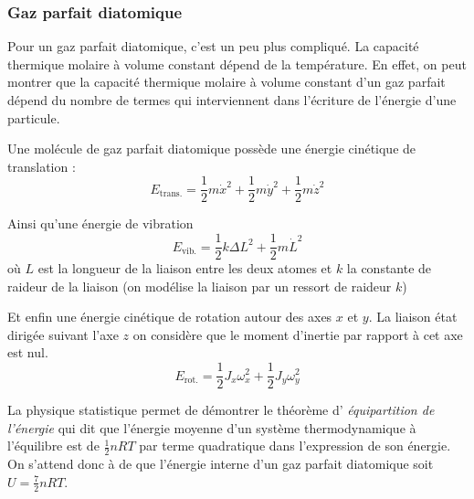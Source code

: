 \documentclass{cours}
\begin{document}
\subsubsection{Gaz parfait diatomique}%
\label{ssub:GP_diatomique}
Pour un gaz parfait diatomique, c'est un peu plus compliqué. La capacité thermique molaire à volume constant dépend de la température. En effet, on peut montrer que la capacité thermique molaire à volume constant d'un gaz parfait dépend du nombre de termes qui interviennent dans l'écriture de l'énergie d'une particule. 

Une molécule de gaz parfait diatomique possède une énergie cinétique de translation :
\begin{equation}
  E_{\text{trans.}} = \frac{1}{2}m \dot{x}^2 + \frac{1}{2}m \dot{y}^2 + \frac{1}{2}m \dot{z}^2
\end{equation}

Ainsi qu'une énergie de vibration 
 \begin{equation}
   E_\text{vib.} = \frac{1}{2}k \Delta L^2 + \frac{1}{2}m \dot{L}^2
 \end{equation}
 où $L$ est la longueur de la liaison entre les deux atomes et $k$ la constante de raideur de la liaison (on modélise la liaison par un ressort de raideur $k$)

 Et enfin une énergie cinétique de rotation autour des axes $x$ et $y$. La liaison état dirigée suivant l'axe $z$ on considère que le moment d'inertie par rapport à cet axe est nul.
 \begin{equation}
   E_\text{rot.} = \frac{1}{2}J_x\omega_x^2 + \frac{1}{2}J_y\omega_y^2
 \end{equation}
 
 La physique statistique permet de démontrer le théorème d' \emph{équipartition de l'énergie} qui dit que l'énergie moyenne d'un système thermodynamique à l'équilibre est de $\frac{1}{2}nRT$ par terme quadratique dans l'expression de son énergie. On s'attend donc à de que l'énergie interne d'un gaz parfait diatomique soit $U=\frac{7}{2}nRT$. 
\end{document}
